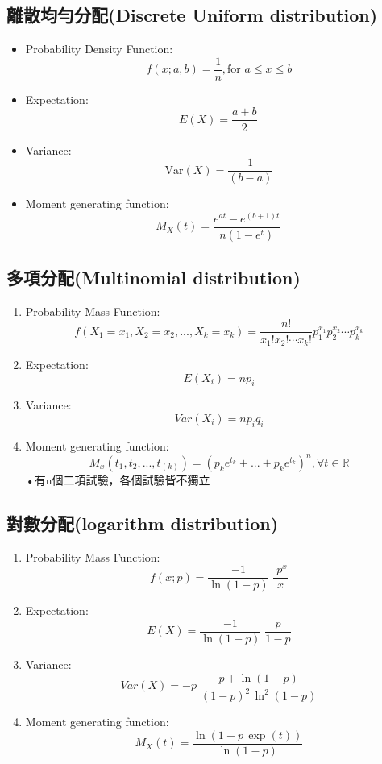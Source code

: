 \subsection{離散均勻分配(Discrete Uniform distribution)}
\begin{itemize}
\item Probability Density Function:$$f(x;a,b)=\frac{1}{n} ,\mbox{for }a\le x \le b$$
\item Expectation:$$E(X) = \frac{a+b}{2}\,$$
\item Variance:$$\text{Var}(X) = \frac{1}{(b-a)}$$
\item Moment generating function:$$M_X(t) = \frac{e^{at}-e^{(b+1)t}}{n(1-e^t)}\,$$
\end{itemize}
\subsection{多項分配(Multinomial distribution)}
\begin{enumerate}[(a]
\item Probability Mass Function:$$f(X_1 = x_1, X_2 = x_2, ..., X_k = x_k) = \frac{n!}{x_1!x_2!\cdots x_k!}p_1^{x_1} p_2^{x_2} \cdots p_k^{x_k}$$
\item Expectation:$$E(X_{i})=np_{i}$$
\item Variance:$$Var(X_{i})=np_{i}q_{i}$$
\item Moment generating function:$$M_{x}(t_{1},t_{2},...,t_(k))=(p_{k}e^{t_{k}}+...+p_{k}e^{t_{k}})^n,\forall t\in \mathbb{R}$$
•有n個二項試驗，各個試驗皆不獨立
\end{enumerate}
\subsection{對數分配(logarithm distribution)}
\begin{enumerate}[(a]
\item Probability Mass Function:$$f(x;p)={\displaystyle {\frac {-1}{\ln(1-p)}}\;{\frac {\;p^{x}}{x}}\!}$$
\item Expectation:$$E(X)={\displaystyle {\frac {-1}{\ln(1-p)}}\;{\frac {p}{1-p}}\!}$$
\item Variance:$$Var(X)={\displaystyle -p\;{\frac {p+\ln(1-p)}{(1-p)^{2}\,\ln ^{2}(1-p)}}\!}$$
\item Moment generating function:$$M_X(t) ={\displaystyle {\frac {\ln(1-p\,\exp(t))}{\ln(1-p)}}\!}$$
\end{enumerate}
